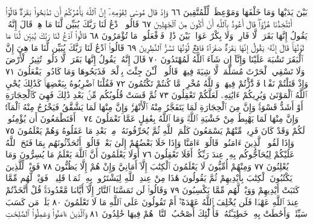 بَيْنَ يَدَيْهَا وَمَا خَلْفَهَا وَمَوْعِظَةࣰ لِّلْمُتَّقِينَ ٦٦ وَإِذْ قَالَ
مُوسَىٰ لِقَوْمِهِۦٓ إِنَّ ٱللَّهَ يَأْمُرُكُمْ أَن تَذْبَحُوا۟ بَقَرَةࣰۖ قَالُوٓا۟
أَتَتَّخِذُنَا هُزُوࣰاۖ قَالَ أَعُوذُ بِٱللَّهِ أَنْ أَكُونَ مِنَ ٱلْجَٰهِلِينَ ٦٧
قَالُوا۟ ٱدْعُ لَنَا رَبَّكَ يُبَيِّن لَّنَا مَا هِيَۚ قَالَ إِنَّهُۥ يَقُولُ إِنَّهَا
بَقَرَةࣱ لَّا فَارِضࣱ وَلَا بِكْرٌ عَوَانُۢ بَيْنَ ذَٰلِكَۖ فَٱفْعَلُوا۟ مَا
تُؤْمَرُونَ ٦٨ قَالُوا۟ ٱدْعُ لَنَا رَبَّكَ يُبَيِّن لَّنَا مَا لَوْنُهَاۚ قَالَ إِنَّهُۥ
يَقُولُ إِنَّهَا بَقَرَةࣱ صَفْرَآءُ فَاقِعࣱ لَّوْنُهَا تَسُرُّ ٱلنَّٰظِرِينَ ٦٩
قَالُوا۟ ٱدْعُ لَنَا رَبَّكَ يُبَيِّن لَّنَا مَا هِيَ إِنَّ ٱلْبَقَرَ تَشَٰبَهَ عَلَيْنَا وَإِنَّآ
إِن شَآءَ ٱللَّهُ لَمُهْتَدُونَ ٧٠ قَالَ إِنَّهُۥ يَقُولُ إِنَّهَا بَقَرَةࣱ لَّا ذَلُولࣱ
تُثِيرُ ٱلْأَرْضَ وَلَا تَسْقِي ٱلْحَرْثَ مُسَلَّمَةࣱ لَّا شِيَةَ فِيهَاۚ قَالُوا۟
ٱلْـَٰٔنَ جِئْتَ بِٱلْحَقِّۚ فَذَبَحُوهَا وَمَا كَادُوا۟ يَفْعَلُونَ ٧١ وَإِذْ
قَتَلْتُمْ نَفْسࣰا فَٱدَّٰرَٰ͏ْٔتُمْ فِيهَاۖ وَٱللَّهُ مُخْرِجࣱ مَّا كُنتُمْ تَكْتُمُونَ ٧٢
فَقُلْنَا ٱضْرِبُوهُ بِبَعْضِهَاۚ كَذَٰلِكَ يُحْيِ ٱللَّهُ ٱلْمَوْتَىٰ وَيُرِيكُمْ
ءَايَٰتِهِۦ لَعَلَّكُمْ تَعْقِلُونَ ٧٣ ثُمَّ قَسَتْ قُلُوبُكُم مِّنۢ بَعْدِ ذَٰلِكَ
فَهِيَ كَٱلْحِجَارَةِ أَوْ أَشَدُّ قَسْوَةࣰۚ وَإِنَّ مِنَ ٱلْحِجَارَةِ لَمَا يَتَفَجَّرُ
مِنْهُ ٱلْأَنْهَٰرُۚ وَإِنَّ مِنْهَا لَمَا يَشَّقَّقُ فَيَخْرُجُ مِنْهُ ٱلْمَآءُۚ وَإِنَّ
مِنْهَا لَمَا يَهْبِطُ مِنْ خَشْيَةِ ٱللَّهِۗ وَمَا ٱللَّهُ بِغَٰفِلٍ عَمَّا تَعْمَلُونَ ٧٤
۞ أَفَتَطْمَعُونَ أَن يُؤْمِنُوا۟ لَكُمْ وَقَدْ كَانَ فَرِيقࣱ مِّنْهُمْ
يَسْمَعُونَ كَلَٰمَ ٱللَّهِ ثُمَّ يُحَرِّفُونَهُۥ مِنۢ بَعْدِ مَا عَقَلُوهُ وَهُمْ
يَعْلَمُونَ ٧٥ وَإِذَا لَقُوا۟ ٱلَّذِينَ ءَامَنُوا۟ قَالُوٓا۟ ءَامَنَّا وَإِذَا
خَلَا بَعْضُهُمْ إِلَىٰ بَعْضࣲ قَالُوٓا۟ أَتُحَدِّثُونَهُم بِمَا فَتَحَ ٱللَّهُ
عَلَيْكُمْ لِيُحَآجُّوكُم بِهِۦ عِندَ رَبِّكُمْۚ أَفَلَا تَعْقِلُونَ ٧٦
أَوَلَا يَعْلَمُونَ أَنَّ ٱللَّهَ يَعْلَمُ مَا يُسِرُّونَ وَمَا يُعْلِنُونَ ٧٧
وَمِنْهُمْ أُمِّيُّونَ لَا يَعْلَمُونَ ٱلْكِتَٰبَ إِلَّآ أَمَانِيَّ وَإِنْ هُمْ
إِلَّا يَظُنُّونَ ٧٨ فَوَيْلࣱ لِّلَّذِينَ يَكْتُبُونَ ٱلْكِتَٰبَ بِأَيْدِيهِمْ
ثُمَّ يَقُولُونَ هَٰذَا مِنْ عِندِ ٱللَّهِ لِيَشْتَرُوا۟ بِهِۦ ثَمَنࣰا قَلِيلࣰاۖ
فَوَيْلࣱ لَّهُم مِّمَّا كَتَبَتْ أَيْدِيهِمْ وَوَيْلࣱ لَّهُم مِّمَّا يَكْسِبُونَ ٧٩
وَقَالُوا۟ لَن تَمَسَّنَا ٱلنَّارُ إِلَّآ أَيَّامࣰا مَّعْدُودَةࣰۚ قُلْ
أَتَّخَذْتُمْ عِندَ ٱللَّهِ عَهْدࣰا فَلَن يُخْلِفَ ٱللَّهُ عَهْدَهُۥٓۖ أَمْ
تَقُولُونَ عَلَى ٱللَّهِ مَا لَا تَعْلَمُونَ ٨٠ بَلَىٰۚ مَن كَسَبَ سَيِّئَةࣰ
وَأَحَٰطَتْ بِهِۦ خَطِيٓـَٔتُهُۥ فَأُو۟لَٰٓئِكَ أَصْحَٰبُ ٱلنَّارِۖ هُمْ
فِيهَا خَٰلِدُونَ ٨١ وَٱلَّذِينَ ءَامَنُوا۟ وَعَمِلُوا۟ ٱلصَّٰلِحَٰتِ
